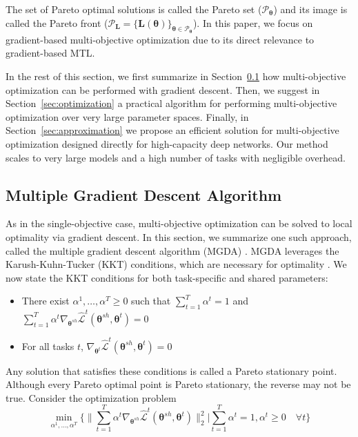 \documentclass{article}
\def\LL{\mathbf{L}}
\def\lL{\mathcal{L}}
\def\pP{\mathcal{P}}
\def\btheta{{\bm\theta}}
\begin{document}
The set of Pareto optimal solutions is called the Pareto set ($\pP_{\btheta}$) and its image is called the Pareto front ($\pP_{\LL} = \{ \LL(\btheta)\}_{\btheta \in \pP_{\btheta}}$). In this paper, we focus on gradient-based multi-objective optimization due to its direct relevance to gradient-based MTL.

In the rest of this section, we first summarize in Section~\ref{sec:mgda} how multi-objective optimization can be performed with gradient descent. Then, we suggest in Section~\ref{sec:optimization} a practical algorithm for performing multi-objective optimization over very large parameter spaces. Finally, in Section~\ref{sec:approximation} we propose an efficient solution for multi-objective optimization designed directly for high-capacity deep networks. Our method scales to very large models and a high number of tasks with negligible overhead.


\subsection{Multiple Gradient Descent Algorithm}
\label{sec:mgda}

As in the single-objective case, multi-objective optimization can be solved to local optimality via gradient descent. In this section, we summarize one such approach, called the multiple gradient descent algorithm (MGDA) \citep{Desideri2012}. MGDA leverages the Karush-Kuhn-Tucker (KKT) conditions, which are necessary for optimality \citep{Fliege2000,Schaffler2002,Desideri2012}. We now state the KKT conditions for both task-specific and shared parameters:
\begin{itemize}[itemsep=0pt,topsep=0pt]
\item There exist $\alpha^1,\ldots, \alpha^T \geq 0$ such that $\sum_{t=1}^T\alpha^t = 1$ and $\sum_{t=1}^T \alpha^t \nabla_{\btheta^{sh}}  \hat{\lL}^t(\btheta^{sh},\btheta^t) = 0$
\item For all tasks $t$,  $\nabla_{\btheta^{t}}  \hat{\lL}^t(\btheta^{sh},\btheta^t) = 0$
\end{itemize}
Any solution that satisfies these conditions is called a Pareto stationary point. Although every Pareto optimal point is Pareto stationary, the reverse may not be true. Consider the optimization problem
\begin{equation}
\min_{\alpha^1,\ldots,\alpha^T}  \Bigg\{  \bigg\| \sum_{t=1}^T \alpha^t \nabla_{\btheta^{sh}}  \hat{\lL}^t(\btheta^{sh},\btheta^t) \bigg\|_2^2 \bigg |  \sum_{t=1}^T \alpha^t = 1, \alpha^t \geq 0 \quad \forall t \Bigg\}
\label{eq:kkt_opt}
\end{equation}
\end{document}
